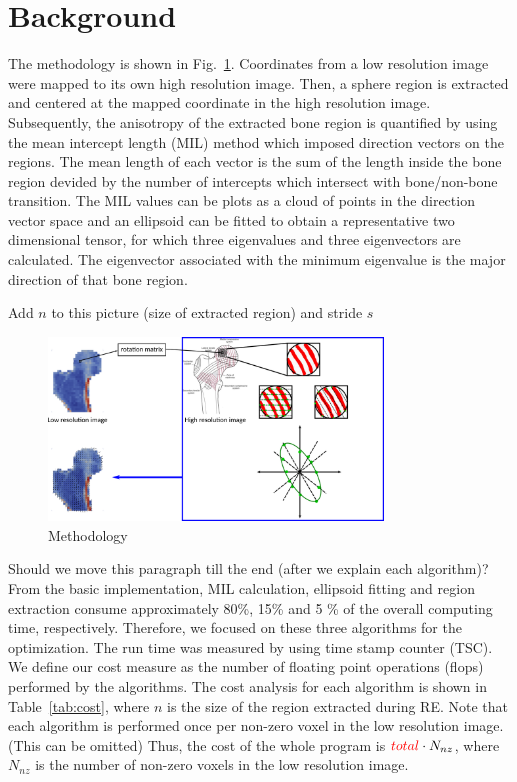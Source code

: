 \documentclass[letterpaper]{article}
\begin{document}
\section{Background}\label{sec:background}
The methodology is shown in Fig.~\ref{fig:method}. Coordinates from a low resolution image were mapped to its own high resolution image. Then, a sphere region is extracted and centered at the mapped coordinate in the high resolution image. 
Subsequently, the anisotropy of the extracted bone region is quantified by using the mean intercept length (MIL) method which imposed direction vectors on the regions. The mean length of each vector is the sum of the length inside the bone region devided by the number of intercepts which intersect with bone/non-bone transition.
The MIL values can be plots as a cloud of points in the direction vector space and an ellipsoid can be fitted to obtain a representative two dimensional tensor, for which three eigenvalues and three eigenvectors are calculated. The eigenvector associated with the minimum eigenvalue is the major direction of that bone region.

{\color{red} Add $n$ to this picture (size of extracted region) and stride $s$}
\begin{figure}[ht]
  \centering
  \includegraphics[width=3.5in]{figs/overview.png}
  \caption{Methodology}
  \label{fig:method}
\end{figure}

{\color{red} Should we move this paragraph till the end (after we explain each algorithm)?}
From the basic implementation, MIL calculation, ellipsoid fitting and region extraction consume approximately {\color{red} 80\%, 15\% and 5 \%} of the overall computing time, respectively. Therefore, we focused on these three algorithms for the optimization. The run time was measured by using time stamp counter (TSC).  We define our cost measure as the number of floating point operations (flops) performed by the algorithms. The cost analysis for each algorithm is shown in Table~\ref{tab:cost}, where $n$ is the size of the region extracted during RE. Note that each algorithm is performed once per non-zero voxel in the low resolution image. {\color{red} (This can be omitted)} Thus, the cost of the whole program is ${\color{red} total}\cdot N_{nz}$, where $N_{nz}$ is the number of non-zero voxels in the low resolution image.
\end{document}
